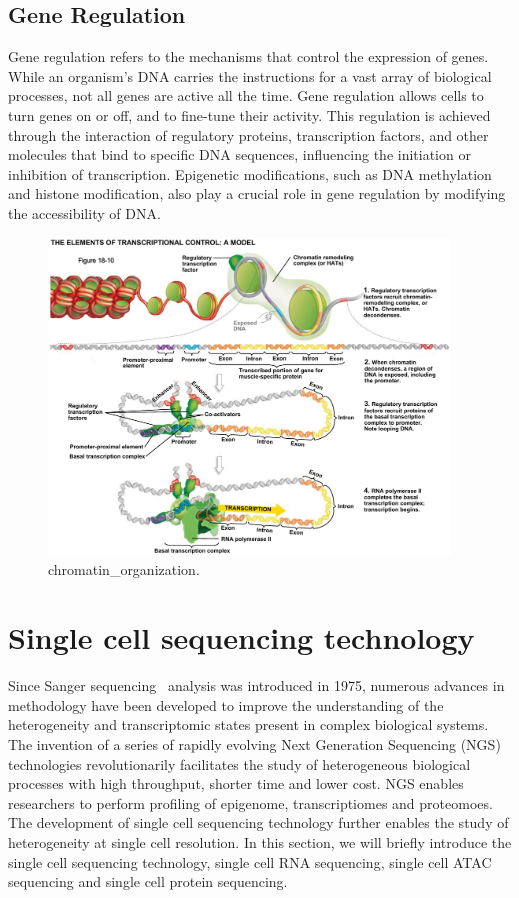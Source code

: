 \subsection{Gene Regulation}
Gene regulation refers to the mechanisms that control the expression of genes. While an organism's DNA carries the instructions for a vast array of biological processes, not all genes are active all the time. Gene regulation allows cells to turn genes on or off, and to fine-tune their activity. This regulation is achieved through the interaction of regulatory proteins, transcription factors, and other molecules that bind to specific DNA sequences, influencing the initiation or inhibition of transcription. Epigenetic modifications, such as DNA methylation and histone modification, also play a crucial role in gene regulation by modifying the accessibility of DNA.


\begin{figure}[!ht]
	\centering
	\includegraphics[width=0.95\textwidth]{chromatin_organization/fig}
	\vspace{0.1cm}
	\caption[chromatin\_organization.]{
	chromatin\_organization.}
	\label{fig:chromatin_organization}
\end{figure}


\section{Single cell sequencing technology}
Since Sanger sequencing~\citep{sanger1975rapid} analysis was introduced in 1975, numerous advances in methodology have been developed to improve the understanding of the heterogeneity and transcriptomic states present in complex biological systems. The invention of a series of rapidly evolving Next Generation Sequencing (NGS) technologies revolutionarily facilitates the study of heterogeneous biological processes with high throughput, shorter time and lower cost. NGS enables researchers to perform profiling of epigenome, transcriptiomes and proteomoes. The development of single cell sequencing technology further enables the study of heterogeneity at single cell resolution. In this section, we will briefly introduce the single cell sequencing technology,  single cell RNA sequencing, single cell ATAC sequencing and single cell protein sequencing.


